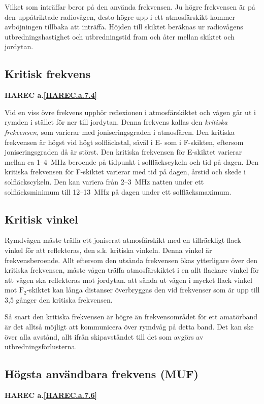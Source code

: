 Vilket som inträffar beror på den använda frekvensen. Ju högre
frekvensen är på den uppåtriktade radiovågen, desto högre upp i ett
atmosfärskikt kommer avböjningen tillbaka att inträffa. Höjden till
skiktet beräknas ur radiovågens utbredningshastighet och
utbredningstid fram och åter mellan skiktet och jordytan.

\subsection{Kritisk frekvens}
\textbf{
HAREC a.\ref{HAREC.a.7.4}\label{myHAREC.a.7.4}
}

Vid en viss övre frekvens upphör reflexionen i atmosfärskiktet och
vågen går ut i rymden i stället för ner till jordytan. Denna frekvens
kallas den \emph{kritiska frekvensen}, som varierar med
joniseringsgraden i atmosfären. Den kritiska frekvensen är högst vid
högt solfläckstal, såväl i E- som i F-skikten, eftersom
joniseringsgraden då är störst. Den kritiska frekvensen för E-skiktet
varierar mellan ca 1--4~MHz beroende på tidpunkt i solfläckscykeln
och tid på dagen. Den kritiska frekvensen för F-skiktet varierar med
tid på dagen, årstid och skede i solfläckscykeln.  Den kan variera
från 2--3~MHz natten under ett solfläcksminimum till 12--13~MHz på
dagen under ett solfläcksmaximum.

\subsection{Kritisk vinkel}

Rymdvågen måste träffa ett joniserat atmosfärskikt med en tillräckligt
flack vinkel för att reflekteras, den s.k. kritiska vinkeln. Denna
vinkel är frekvensberoende. Allt eftersom den utsända frekvensen ökas
ytterligare över den kritiska frekvensen, måste vågen träffa
atmosfärskiktet i en allt flackare vinkel för att vågen ska
reflekteras mot jordytan.  att sända ut vågen i mycket flack vinkel
mot \(\mathrm{F_2}\)-skiktet kan långa distanser överbryggas den vid
frekvenser som är upp till 3,5 gånger den kritiska frekvensen.

Så snart den kritiska frekvensen är högre än frekvensområdet för ett
amatörband är det alltså möjligt att kommunicera över rymdvåg på detta
band. Det kan ske över alla avstånd, allt ifrån skipavståndet till det
som avgörs av utbredningsförlusterna.

\subsection{Högsta användbara frekvens (MUF)}
\textbf{
HAREC a.\ref{HAREC.a.7.6}\label{myHAREC.a.7.6}
}

